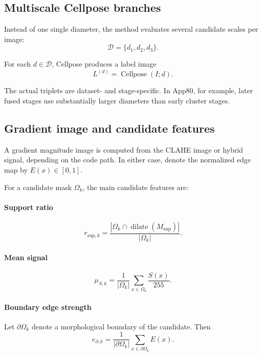 \documentclass[11pt]{article}
\newcommand{\1}{\mathbf{1}}
\newcommand{\dilate}{\operatorname{dilate}}
\newcommand{\support}{M_{\mathrm{sup}}}
\newcommand{\edgefield}{E}
\newcommand{\signal}{S}
\newcommand{\gray}{I}
\newcommand{\labelmap}{L}
\begin{document}
\subsection{Multiscale Cellpose branches}
Instead of one single diameter, the method evaluates several candidate scales per image:
\begin{equation}
\mathcal{D} = \{d_1,d_2,d_3\}.
\end{equation}

For each $d \in \mathcal{D}$, Cellpose produces a label image
\begin{equation}
\labelmap^{(d)} = \operatorname{Cellpose}(\gray; d).
\end{equation}

The actual triplets are dataset- and stage-specific. In App80, for example, later fused stages use substantially larger diameters than early cluster stages.

\subsection{Gradient image and candidate features}
A gradient magnitude image is computed from the CLAHE image or hybrid signal, depending on the code path. In either case, denote the normalized edge map by $\edgefield(x)\in[0,1]$.

For a candidate mask $\Omega_k$, the main candidate features are:
\paragraph{Support ratio}
\begin{equation}
r_{\mathrm{sup},k} = \frac{|\Omega_k \cap \dilate(\support)|}{|\Omega_k|}.
\end{equation}

\paragraph{Mean signal}
\begin{equation}
\mu_{\signal,k} = \frac{1}{|\Omega_k|}\sum_{x\in\Omega_k} \frac{\signal(x)}{255}.
\end{equation}

\paragraph{Boundary edge strength}
Let $\partial \Omega_k$ denote a morphological boundary of the candidate. Then
\begin{equation}
e_{\partial,k} = \frac{1}{|\partial \Omega_k|}\sum_{x\in\partial \Omega_k} \edgefield(x).
\end{equation}
\end{document}
